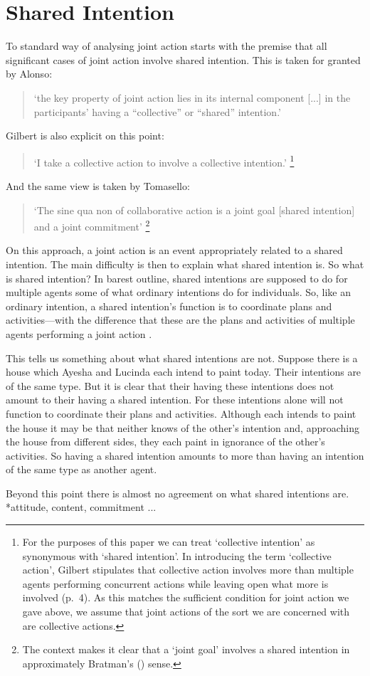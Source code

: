 \documentclass[12pt,a4paper]{extarticle}
\begin{document}
\section{Shared Intention}
To standard way of analysing joint action starts with the premise that all significant cases of joint action involve shared intention.  This is taken for granted by Alonso:
%
\begin{quote}
`the key property of joint action lies in its internal component [...] in the participants’ having a “collective” or “shared” intention.' \citep[pp. 444-5]{alonso_shared_2009}
\end{quote}
%
Gilbert is also explicit on this point:  
%
\begin{quote} 
`I take a collective action to involve a collective intention.'  \citep[p.\ 5]{Gilbert:2006wr}\footnote{
For the purposes of this paper we can treat `collective intention' as synonymous with `shared intention'.  
In introducing the term `collective action', Gilbert stipulates that collective action involves more than multiple agents performing concurrent actions while leaving open what more is involved (p.\ 4).   
As this matches the sufficient condition for joint action we gave above, we assume that joint actions of the sort we are concerned with are collective actions.
}
\end{quote}
%
And the same view is taken by Tomasello:
%
\begin{quote}
`The sine qua non of collaborative action is a joint goal [shared intention] and a joint commitment’ 
\citep[p.\ 181]{tomasello:2008origins}\footnote{
The context makes it clear that a `joint goal' involves a shared intention in approximately Bratman's (\citeyear{Bratman:1993je}) sense.
}
\end{quote}
%
On this approach, a joint action is an event appropriately related to a shared intention.
The main difficulty is then to explain what shared intention is.
So what is shared intention?  
In barest outline, shared intentions are supposed to do for multiple agents some of what ordinary intentions do for individuals.  
So, like an ordinary intention, a shared intention's function is to coordinate plans and activities---with the difference that these are the plans and activities of multiple agents performing a joint action \citep{Bratman:1993je}.

This tells us something about what shared intentions are not.
Suppose there is a house which Ayesha and Lucinda each intend to paint today.
Their intentions are of the same type.
But it is clear that their having these intentions does not amount to their having a shared intention.
For these intentions alone will not function to coordinate their plans and activities.
Although each intends to paint the house it may be that neither knows of the other's intention and, approaching the house from different sides, they each paint in ignorance of the other's activities.  
So having a shared intention amounts to more than having an intention of the same type as another agent.

Beyond this point there is almost no agreement on what shared intentions are.
*attitude, content, commitment ...







\end{document}
